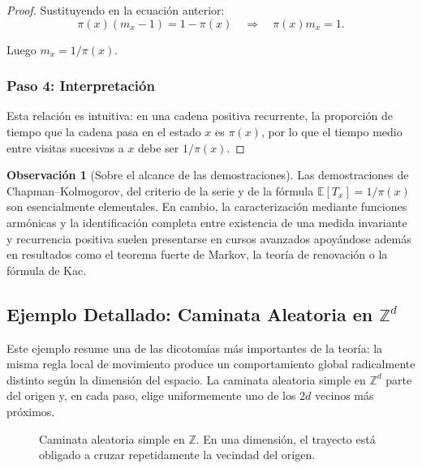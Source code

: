 \documentclass[11pt,a4paper]{article}
\theoremstyle{plain}
\theoremstyle{definition}
\newtheorem{observacion}[teorema]{Observación}
\theoremstyle{remark}
\newcommand{\Z}{\mathbb{Z}}
\newcommand{\E}{\mathbb{E}}
\newcommand{\1}{\mathds{1}}
\begin{document}
\begin{proof}
Sustituyendo en la ecuación anterior:
\[
\pi(x) (m_x - 1) = 1 - \pi(x) \quad \Rightarrow \quad \pi(x) m_x = 1.
\]

Luego \(m_x = 1/\pi(x)\).

\subsubsection*{Paso 4: Interpretación}
Esta relación es intuitiva: en una cadena positiva recurrente, la proporción de tiempo que la cadena pasa en el estado \(x\) es \(\pi(x)\), por lo que el tiempo medio entre visitas sucesivas a \(x\) debe ser \(1/\pi(x)\).
\end{proof}

\begin{observacion}[Sobre el alcance de las demostraciones]
Las demostraciones de Chapman--Kolmogorov, del criterio de la serie y de la fórmula \(\E[T_x]=1/\pi(x)\) son esencialmente elementales. En cambio, la caracterización mediante funciones armónicas y la identificación completa entre existencia de una medida invariante y recurrencia positiva suelen presentarse en cursos avanzados apoyándose además en resultados como el teorema fuerte de Markov, la teoría de renovación o la fórmula de Kac.
\end{observacion}





\subsection{Ejemplo Detallado: Caminata Aleatoria en \(\Z^d\)}

Este ejemplo resume una de las dicotomías más importantes de la teoría: la misma regla local de movimiento produce un comportamiento global radicalmente distinto según la dimensión del espacio. La caminata aleatoria simple en \(\Z^d\) parte del origen y, en cada paso, elige uniformemente uno de los \(2d\) vecinos más próximos.


\begin{figure}[p]
\centering
{}
\caption{Caminata aleatoria simple en \(\Z\). En una dimensión, el trayecto está obligado a cruzar repetidamente la vecindad del origen.}
\end{figure}
\end{document}
